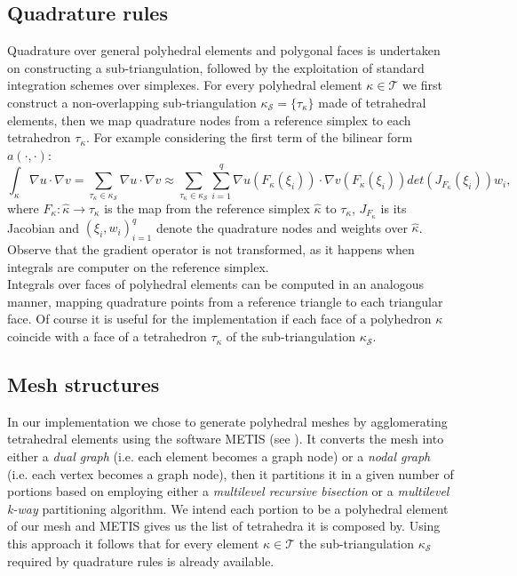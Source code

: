 \documentclass[12pt, a4paper]{article}
\theoremstyle{definition}
\theoremstyle{plain}
\theoremstyle{plain}
\theoremstyle{definition}
\begin{document}
\subsection{Quadrature rules}
Quadrature over general polyhedral elements and polygonal faces is undertaken 
on constructing a sub-triangulation, followed by the exploitation of 
standard integration schemes over simplexes. For every polyhedral element 
$\kappa \in 
\mathcal{T}$ we first construct a non-overlapping sub-triangulation 
$\kappa_\mathcal{S} = \{\tau_\kappa\}$ made of tetrahedral elements, then we 
map quadrature nodes from a reference simplex to each tetrahedron 
$\tau_\kappa$. For example considering the first term of the bilinear form 
$a(\cdot, \cdot)$:
\begin{equation*}
	\int_\kappa \nabla u \cdot \nabla v = \sum_{\tau_\kappa \in \kappa_\mathcal{S}} \nabla u \cdot \nabla v \approx \sum_{\tau_\kappa \in \kappa_\mathcal{S}} \sum_{i=1}^{q} \nabla u(F_\kappa(\xi_i)) \cdot \nabla v(F_\kappa(\xi_i)) det(J_{F_\kappa}(\xi_i))w_i,
\end{equation*}
where $F_\kappa: \hat{\kappa} \rightarrow \tau_\kappa$ is the map from the 
reference simplex $\hat{\kappa}$ to $\tau_\kappa$, $J_{F_\kappa}$ is its 
Jacobian	and $(\xi_i, w_i)^q_{i=1}$ denote the quadrature nodes and weights 
over $\hat{\kappa}$. Observe that the gradient operator is not transformed, as 
it happens when integrals are computer on the reference simplex.\\
Integrals over faces of polyhedral elements can be computed in an analogous 
manner, mapping quadrature points from a reference triangle to each triangular 
face. Of course it is useful for the implementation if each face of a 
polyhedron $\kappa$ coincide with a face of a tetrahedron $\tau_\kappa$ of the 
sub-triangulation $\kappa_\mathcal{S}$.
\subsection{Mesh structures} \label{subsec:meshstructures}
In our implementation we chose to generate polyhedral meshes by agglomerating 
tetrahedral elements using the software 
METIS (see \cite{metis}). It 
converts the mesh into either a \textit{dual graph} (i.e. each element becomes 
a graph node) or a \textit{nodal graph} (i.e. each vertex becomes a graph 
node), then it partitions it in a given number of portions based on employing 
either a \textit{multilevel recursive bisection} or a \textit{multilevel k-way} 
partitioning algorithm. We intend each portion to be a polyhedral element of 
our mesh and METIS gives us the list of tetrahedra it is composed by. Using 
this approach it follows that for every element $\kappa \in \mathcal{T}$ the 
sub-triangulation $\kappa_\mathcal{S}$ required by quadrature rules is already 
available.
\newpage
\end{document}
